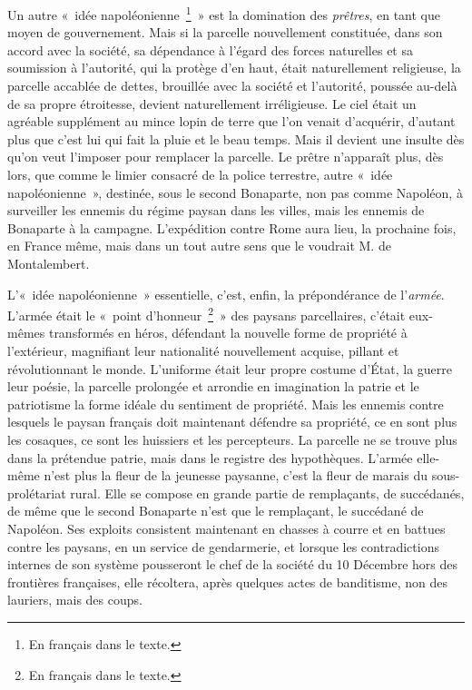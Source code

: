 \documentclass[french,twoside]{book} %
\begin{document}
Un autre « idée napoléonienne \footnote{En français dans le texte.} » est la domination des \emph{prêtres}, en tant que moyen de gouvernement. Mais si la parcelle nouvellement constituée, dans son accord avec la société, sa dépendance à l’égard des forces naturelles et sa soumission à l’autorité, qui la protège d’en haut, était naturellement religieuse, la parcelle accablée de dettes, brouillée avec la société et l’autorité, poussée au-delà de sa propre étroitesse, devient naturellement irréligieuse. Le ciel était un agréable supplément au mince lopin de terre que l’on venait d’acquérir, d’autant plus que c’est lui qui fait la pluie et le beau temps. Mais il devient une insulte dès qu’on veut l’imposer pour remplacer la parcelle. Le prêtre n’apparaît plus, dès lors, que comme le limier consacré de la police terrestre, autre « idée napoléonienne », destinée, sous le second Bonaparte, non pas comme Napoléon, à surveiller les ennemis du régime paysan dans les villes, mais les ennemis de Bonaparte à la campagne. L’expédition contre Rome aura lieu, la prochaine fois, en France même, mais dans un tout autre sens que le voudrait M. de Montalembert.\par
L’« idée napoléonienne » essentielle, c’est, enfin, la prépondérance de l’\emph{armée}. L’armée était le « point d’honneur \footnote{En français dans le texte.} » des paysans parcellaires, c’était eux-mêmes transformés en héros, défendant la nouvelle forme de propriété à l’extérieur, magnifiant leur nationalité nouvellement acquise, pillant et révolutionnant le monde. L’uniforme était leur propre costume d’État, la guerre leur poésie, la parcelle prolongée et arrondie en imagination la patrie et le patriotisme la forme idéale du sentiment de propriété. Mais les ennemis contre lesquels le paysan français doit maintenant défendre sa propriété, ce en sont plus les cosaques, ce sont les huissiers et les percepteurs. La parcelle ne se trouve plus dans la prétendue patrie, mais dans le registre des hypothèques. L’armée elle-même n’est plus la fleur de la jeunesse paysanne, c’est la fleur de marais du sous-prolétariat rural. Elle se compose en grande partie de remplaçants, de succédanés, de même que le second Bonaparte n’est que le remplaçant, le succédané de Napoléon. Ses exploits consistent maintenant en chasses à courre et en battues contre les paysans, en un service de gendarmerie, et lorsque les contradictions internes de son système pousseront le chef de la société du 10 Décembre hors des frontières françaises, elle récoltera, après quelques actes de banditisme, non des lauriers, mais des coups.\par
\end{document}
